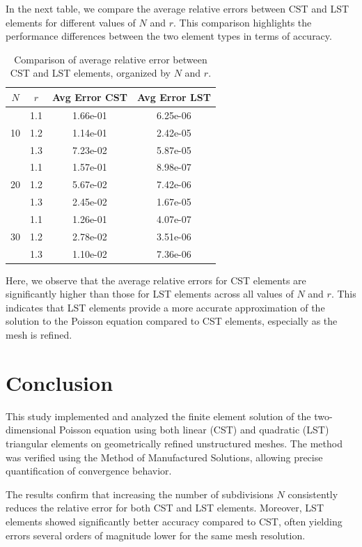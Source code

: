 \documentclass[12pt]{article}
\begin{document}
In the next table, we compare the average relative errors between CST and LST elements for different values of $N$ and $r$. This comparison highlights the performance differences between the two element types in terms of accuracy.

\begin{table}[H]
\centering
\caption{Comparison of average relative error between CST and LST elements, organized by $N$ and $r$.}
\begin{tabular}{|c|c|c|c|}
\hline
\textbf{$N$} & \textbf{$r$} & \textbf{Avg Error CST} & \textbf{Avg Error LST} \\
\hline
\multirow{3}{*}{10} 
& 1.1 & 1.66e-01 & 6.25e-06 \\
& 1.2 & 1.14e-01 & 2.42e-05 \\
& 1.3 & 7.23e-02 & 5.87e-05 \\
\hline
\multirow{3}{*}{20} 
& 1.1 & 1.57e-01 & 8.98e-07 \\
& 1.2 & 5.67e-02 & 7.42e-06 \\
& 1.3 & 2.45e-02 & 1.67e-05 \\
\hline
\multirow{3}{*}{30} 
& 1.1 & 1.26e-01 & 4.07e-07 \\
& 1.2 & 2.78e-02 & 3.51e-06 \\
& 1.3 & 1.10e-02 & 7.36e-06 \\
\hline
\end{tabular}
\label{tab:avg_error_comparison_refined}
\end{table}

Here, we observe that the average relative errors for CST elements are significantly higher than those for LST elements across all values of $N$ and $r$. This indicates that LST elements provide a more accurate approximation of the solution to the Poisson equation compared to CST elements, especially as the mesh is refined.


\newpage
\section{Conclusion}

This study implemented and analyzed the finite element solution of the two-dimensional Poisson equation using both linear (CST) and quadratic (LST) triangular elements on geometrically refined unstructured meshes. The method was verified using the Method of Manufactured Solutions, allowing precise quantification of convergence behavior.

The results confirm that increasing the number of subdivisions $N$ consistently reduces the relative error for both CST and LST elements. Moreover, LST elements showed significantly better accuracy compared to CST, often yielding errors several orders of magnitude lower for the same mesh resolution.
\end{document}
